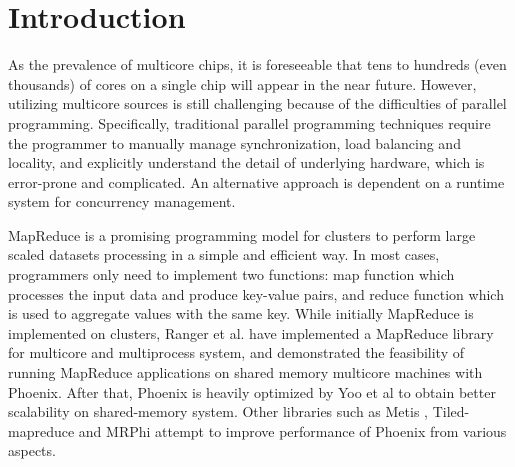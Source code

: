 \section{Introduction}
\label{sec:intro}



As the prevalence of multicore chips, it is foreseeable that tens to hundreds (even thousands) of cores on a single chip will appear in the near future\cite{Borkar2007core}.
However, utilizing multicore sources is still challenging because of the difficulties of parallel programming.
Specifically, traditional parallel programming techniques require the programmer to manually manage synchronization, load balancing and locality, and explicitly understand the detail of underlying hardware, which is error-prone and complicated. %
An alternative approach is dependent on a runtime system for concurrency management. 

MapReduce\cite{dean2004mapreduce} is a promising programming model for clusters to perform large scaled datasets processing in a simple and efficient way.
In most cases, programmers only need to implement two functions: 
map function which processes the input data and produce key-value pairs, and reduce function which is used to aggregate values with the same key.
While initially MapReduce is implemented on clusters, Ranger et al. have implemented a MapReduce library for multicore and multiprocess system, and demonstrated the feasibility of running MapReduce applications on shared memory multicore machines with Phoenix\cite{ranger2007phoenix}.
After that, Phoenix is heavily optimized by Yoo et al\cite{yoo2009phoenix2} to obtain better scalability on shared-memory system.
Other libraries such as Metis\cite{mao2010metis} , Tiled-mapreduce\cite{chen2010tiled} and MRPhi\cite{lu2013mrphi} attempt to improve performance of Phoenix from various aspects.



